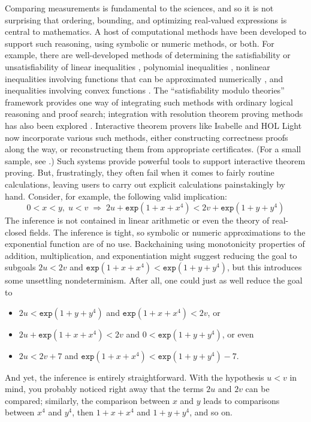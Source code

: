 \documentclass[runningheds]{llncs}
\newcommand{\myRightarrow}{\; \Rightarrow \;}
\newcommand{\fn}[1]{\mathtt{#1}} \newcommand{\nroot}{\fn{root}}
\begin{document}
Comparing measurements is fundamental to the sciences, and so it is not surprising that ordering, bounding, and optimizing real-valued expressions is central to mathematics. A host of computational methods have been developed to support such reasoning, using symbolic or numeric methods, or both. For example, there are well-developed methods of determining the satisfiability or unsatisfiability of linear inequalities \cite{pugh:92} \cite{schrijver:86}, polynomial inequalities \cite{basu:et:al:03}, nonlinear inequalities involving functions that can be approximated numerically \cite{gao:et:al:12} \cite{moore:et:al:09}, and inequalities involving convex functions \cite{boyd:vandenberghe:04}. The ``satisfiability modulo theories'' framework \cite{barrett:et:al:08} \cite{nelson:oppen:79} provides one way of integrating such methods with ordinary logical reasoning and proof search; integration with resolution theorem proving methods has also been explored \cite{akbarpour:paulson:08} \cite{prevosto:waldmann:06}. Interactive theorem provers like Isabelle \cite{nipkow:et:al:02} and HOL Light \cite{harrison:07c} now incorporate various such methods, either constructing correctness proofs along the way, or reconstructing them from appropriate certificates. (For a small sample, see \cite{blanchette:et:al:11} \cite{chaieb:nipkow:08} \cite{harrison:07b} \cite{mclaughlin:harrison:05}.)
Such systems provide powerful tools to support interactive theorem proving. But, frustratingly, they often fail when it comes to fairly routine calculations, leaving users to carry out explicit calculations painstakingly by hand. Consider, for example, the following valid implication:
\[
 0 < x < y, \; u < v \myRightarrow 2 u + \fn{exp}(1 + x + x^4) < 2 v + \fn{exp}(1 + y + y^4)
\]
The inference is not contained in linear arithmetic or even the theory of real-closed fields. The inference is tight, so symbolic or numeric approximations to the exponential function are of no use. Backchaining using monotonicity properties of addition, multiplication, and exponentiation might suggest reducing the goal to subgoals $2 u < 2 v$ and $\fn{exp}(1 + x + x^4) < \fn{exp}(1 + y + y^4)$, but this introduces some unsettling nondeterminism. After all, one could just as well reduce the goal to
\begin{itemize}
\item $2 u < \fn{exp}(1 + y + y^4)$ and $\fn{exp}(1 + x + x^4) < 2 v$, or
\item $2 u + \fn{exp}(1 + x + x^4) < 2 v$ and $0 < \fn{exp}(1 + y + y^4)$, or even
\item $ 2 u < 2 v + 7$ and $\fn{exp}(1 + x + x^4) < \fn{exp}(1 + y + y^4) - 7$.
\end{itemize}
And yet, the inference is entirely straightforward. With the hypothesis $u < v$ in mind, you probably noticed right away that the terms $2u$ and $2 v$ can be compared; similarly, the comparison between $x$ and $y$ leads to comparisons between $x^4$ and $y^4$, then $1 + x + x^4$ and $1 + y + y^4$, and so on. 
\end{document}
